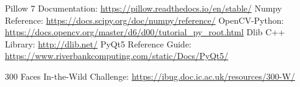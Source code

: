 \newpage
\begin{thebibliography}{9}
    Pillow 7 Documentation: \url{https://pillow.readthedocs.io/en/stable/}
    Numpy Reference: \url{https://docs.scipy.org/doc/numpy/reference/}
    OpenCV-Python: \url{https://docs.opencv.org/master/d6/d00/tutorial_py_root.html}
    Dlib C++ Library: \url{http://dlib.net/}
    PyQt5 Reference Guide: \url{https://www.riverbankcomputing.com/static/Docs/PyQt5/}

    300 Faces In-the-Wild Challenge: \url{https://ibug.doc.ic.ac.uk/resources/300-W/}

\end{thebibliography}